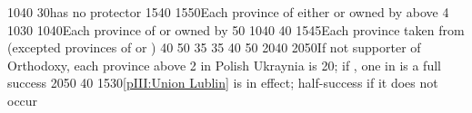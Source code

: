 %
%
%
{10}{40}{}%
%
%
{}{30}{\paysPologne has no protector}%
%
%
{15}{40}{}%
%
%
{15}{50}{Each province of either \paysCrimee or \paysMoldavie owned by
  \paysmajeurRussie above 4}%
%
%
%
\EUobjective{}{\granderegionAlaska}{\COL}%
{10}{30}{\EU@objEachCOL[\granderegionAlaska]}%
%
%
%
{10}{40}{Each province of \paysgeorgie or \paysperse owned by
  \paysmajeurRussie}%
%
%
{}{50}{}%
% 
%
{10}{40}{}%
%
%
{}{40}{}%
%
%
{15}{45}{Each province taken from \paysmajeurTurquie (excepted provinces of
  \paysgeorgie or \paysperse)}%
 
%
%
%
%
{}{40}{}%
%
%
{}{50}{}%
%
%
{}{35}{}%
%
%
{}{35}{}%
%
%
%
%
%
{}{40}{}%
%
%
{}{50}{}%
%
%
{20}{40}{\EU@objNoRUSBaltique}%
%
%
{20}{50}{If not supporter of Orthodoxy, each province above 2 in Polish
  Ukraynia is 20\VPs; if \Xorthodoxe, one \COL in \continentSiberia is a full
  success}%
%
%
%
{20}{50}{}%
%
%
{}{40}{}%
%
%
{15}{30}{\ref{pIII:Union Lublin} is in effect; half-success if it does not
  occur}%
